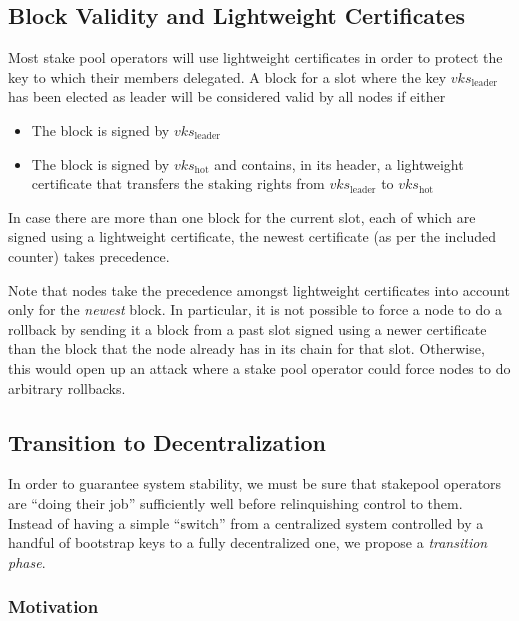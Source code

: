 \documentclass[11pt,a4paper]{article}
\begin{document}
\subsection{Block Validity and Lightweight Certificates}
\label{block-validity-and-lightweight-certificates}

Most stake pool operators will use lightweight certificates in order to
protect the key to which their members delegated. A block for a slot
where the key \(vks_\text{leader}\) has been elected as leader will be
considered valid by all nodes if either

\begin{itemize}
\item
  The block is signed by \(vks_\text{leader}\)
\item
  The block is signed by \(vks_\text{hot}\) and contains, in its header,
  a lightweight certificate that transfers the staking rights from
  \(vks_\text{leader}\) to \(vks_\text{hot}\)
\end{itemize}

In case there are more than one block for the current slot, each of
which are signed using a lightweight certificate, the newest certificate
(as per the included counter) takes precedence.

Note that nodes take the precedence amongst lightweight certificates
into account only for the \emph{newest} block. In particular, it is
not possible to force a node to do a rollback by sending it a block
from a past slot signed using a newer certificate than the block that
the node already has in its chain for that slot. Otherwise, this would
open up an attack where a stake pool operator could force nodes to do
arbitrary rollbacks.

\subsection{Transition to Decentralization}
\label{transition-to-decentralization}

In order to guarantee system stability, we must be sure that stakepool
operators are ``doing their job'' sufficiently well before relinquishing
control to them. Instead of having a simple ``switch'' from a
centralized system controlled by a handful of bootstrap keys to a fully
decentralized one, we propose a \emph{transition phase}.

\subsubsection{Motivation}
\label{motivation}
\end{document}

